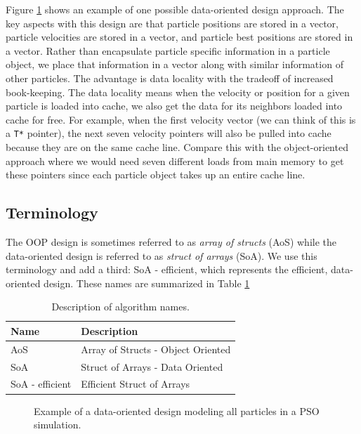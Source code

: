 Figure \ref{fig:particles} shows an example of one possible data-oriented design
approach. The key aspects with this design are that particle positions are stored
in a vector, particle velocities are stored in a vector, and particle best
positions are stored in a vector. Rather than encapsulate particle specific
information in a particle object, we place that information in a vector along
with similar information of other particles. The advantage is data
locality with the tradeoff of increased book-keeping.
The data locality means when the velocity or position for a given particle is
loaded into cache, we also get the data for its neighbors loaded into cache for
free. 
For example, when the first velocity vector (we
can think of this is a \texttt{T*} pointer), the next seven
velocity pointers will also be pulled into cache because they are on the same
cache line. Compare this with the object-oriented approach where we would need
seven different loads from main memory to get these pointers since each particle
object takes up an entire cache line.
\subsection{Terminology}
The OOP design is sometimes referred to as \emph{array of structs} (AoS) while
the data-oriented design is referred to as \emph{struct of arrays} (SoA).
We use this terminology and add a third: SoA - efficient, which
represents the efficient, data-oriented design. These names are summarized in
Table \ref{tab:names}

\begin{table}
  \centering
  \caption{Description of algorithm names.}
  \label{tab:names}
  \begin{tabular}{ll}\toprule
    \textbf{Name} & \textbf{Description}\\\midrule
    AoS & Array of Structs - Object Oriented\\
    SoA & Struct of Arrays - Data Oriented\\
    SoA - efficient & Efficient Struct of Arrays\\\bottomrule
  \end{tabular}
\end{table}

          

\begin{figure}
  
  \caption{Example of a data-oriented design modeling all particles in a PSO
    simulation.}\label{fig:particles}
\end{figure}

